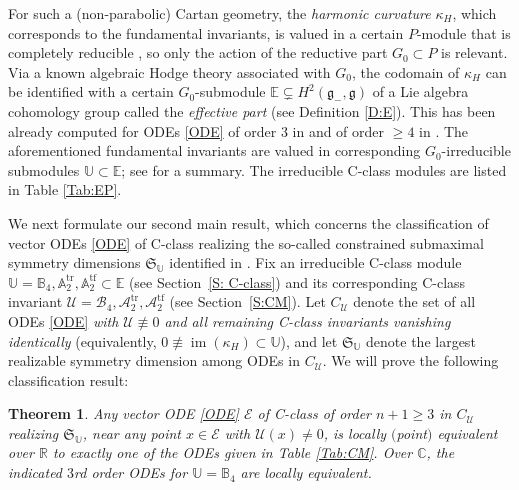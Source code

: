 \documentclass[10pt,a4paper]{amsart}
\DeclareMathOperator{\img}{im}
\DeclareMathOperator{\tf}{tf}
\DeclareMathOperator{\tr}{tr}
\newcommand{\g}{\mathfrak{g}}
\newcommand\fS{\mathfrak{S}}
\newcommand{\R}{\mathbb{R}}
\newcommand{\C}{\mathbb{C}}
\newcommand\bbE{\mathbb{E}}
\newcommand\bbU{\mathbb{U}}
\newcommand\bbA{\mathbb{A}}
\newcommand\bbB{\mathbb{B}}
\newcommand\cU{\mathcal{U}}
\newcommand\cA{\mathcal{A}}
\newcommand\cB{\mathcal{B}}
\newcommand\cE{\mathcal{E}}
\numberwithin{equation}{section}
\newtheorem{Theorem}{Theorem}[section]
\begin{document}
For such a (non-parabolic) Cartan geometry, the {\em harmonic curvature} $\kappa_H$, which corresponds to the fundamental invariants, is valued in a certain $P$-module that is completely reducible \cite[Corollary~3.8]{CDT2020}, so only the action of the reductive part $G_0 \subset P$ is relevant. Via a known algebraic Hodge theory associated with $G_0$, the codomain of $\kappa_H$ can be identified with a certain $G_0$-submodule $\bbE \subsetneq H^2(\g_-,\g)$ of a Lie algebra cohomology group called the {\em effective part} (see Definition \ref{D:E}). This has been already computed for ODEs \eqref{ODE} of order $3$ in \cite{Medvedev2010,Medvedev2011} and of order $\ge 4$ in \cite{DM2014}. The aforementioned fundamental invariants are valued in corresponding $G_0$-irreducible submodules $\bbU \subset \bbE$; see \cite[Table 6]{KT2021} for a summary. The irreducible C-class modules are listed in Table \ref{Tab:EP}.

We next formulate our second main result, which concerns the classification of vector ODEs \eqref{ODE} of C-class realizing the so-called constrained submaximal symmetry dimensions $\fS_\bbU$ identified in \cite[Table 2]{KT2021}. Fix an irreducible C-class module $\bbU = \bbB_4, \bbA_2^{\tr}, \bbA_2^{\tf} \subset \bbE$ (see Section~\ref{S: C-class}) and its corresponding C-class invariant $ \cU = \cB_4, \cA_2^{\tr}, \cA_2^{\tf}$ (see Section~\ref{S:CM}). Let $C_\cU$ denote the set of all ODEs \eqref{ODE} {\em with $\cU \not \equiv 0$ and all remaining C-class invariants vanishing identically} (equivalently, $0 \not \equiv \img(\kappa_H) \subset \bbU$), and let $\fS_\bbU$ denote the largest realizable symmetry dimension among ODEs in $C_\cU$. We will prove the following classification result:


\begin{Theorem} \label{T:Main1}
{\em Any} vector ODE \eqref{ODE} $\cE$ of C-class of order $n+1 \ge 3$ in $C_\cU$ realizing $\fS_\bbU$, near any point $x \in \cE$ with $\cU(x)\ne 0$, is {\em locally} $($point$)$ equivalent over $\R$ to exactly one of the ODEs given in Table {\rm \ref{Tab:CM}}. Over $\C$, the indicated $3$rd order ODEs for $\bbU = \bbB_4$ are locally equivalent.
\end{Theorem}
\end{document}
